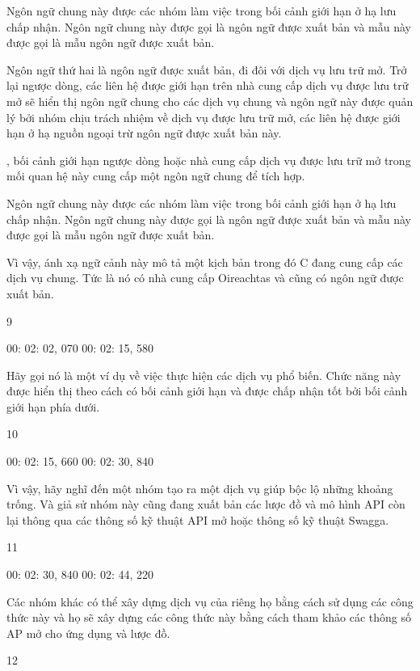 Ngôn ngữ chung này được các nhóm làm việc trong bối cảnh giới hạn ở hạ lưu chấp nhận. Ngôn ngữ chung này được gọi là ngôn ngữ được xuất bản và mẫu này được gọi là mẫu ngôn ngữ được xuất bản.


Ngôn ngữ thứ hai là ngôn ngữ được xuất bản, đi đôi với dịch vụ lưu trữ mở. Trở lại ngược dòng, các liên hệ được giới hạn trên nhà cung cấp dịch vụ được lưu trữ mở sẽ hiển thị ngôn ngữ chung cho các dịch vụ chung và ngôn ngữ này được quản lý bởi nhóm chịu trách nhiệm về dịch vụ được lưu trữ mở, các liên hệ được giới hạn ở hạ nguồn ngoại trừ ngôn ngữ được xuất bản này.




, bối cảnh giới hạn ngược dòng hoặc nhà cung cấp dịch vụ được lưu trữ mở trong mối quan hệ này cung cấp một ngôn ngữ chung để tích hợp.
 

Ngôn ngữ chung này được các nhóm làm việc trong bối cảnh giới hạn ở hạ lưu chấp nhận.
 Ngôn ngữ chung này được gọi là ngôn ngữ được xuất bản và mẫu này được gọi là mẫu ngôn ngữ được xuất bản.
 

 

Vì vậy, ánh xạ ngữ cảnh này mô tả một kịch bản trong đó C đang cung cấp các dịch vụ chung. Tức là nó có nhà cung cấp Oireachtas và cũng có ngôn ngữ được xuất bản.

9

00: 02: 02, 070 00: 02: 15, 580

Hãy gọi nó là một ví dụ về việc thực hiện các dịch vụ phổ biến. Chức năng này được hiển thị theo cách có bối cảnh giới hạn và được chấp nhận tốt bởi bối cảnh giới hạn phía dưới.

10

00: 02: 15, 660 00: 02: 30, 840

Vì vậy, hãy nghĩ đến một nhóm tạo ra một dịch vụ giúp bộc lộ những khoảng trống. Và giả sử nhóm này cũng đang xuất bản các lược đồ và mô hình API còn lại thông qua các thông số kỹ thuật API mở hoặc thông số kỹ thuật Swagga.

11

00: 02: 30, 840 00: 02: 44, 220

Các nhóm khác có thể xây dựng dịch vụ của riêng họ bằng cách sử dụng các công thức này và họ sẽ xây dựng các công thức này bằng cách tham khảo các thông số AP mở cho ứng dụng và lược đồ.

12

